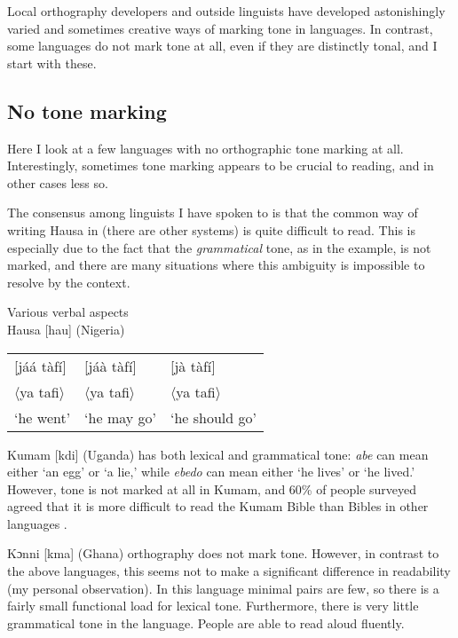 \documentclass[output=paper]{langscibook}
\begin{document}
  Local orthography developers and outside linguists have developed astonishingly varied and sometimes creative ways of marking tone in languages. In contrast, some languages do not mark tone at all, even if they are distinctly tonal, and I start with these.

  \subsection{No tone marking}
  \label{sec:HowToneMarked:NoToneMark:1}
    Here I look at a few languages with no orthographic tone marking at all. Interestingly, sometimes tone marking appears to be crucial to reading, and in other cases less so.

  The consensus among linguists I have spoken to is that the common way of writing Hausa in  (there are other systems) is quite difficult to read. This is especially due to the fact that the \textit{grammatical} tone, as in the example, is not marked, and there are many situations where this ambiguity is impossible to resolve by the context.

\ea Various verbal aspects\label{tab:cahill:VariousVerbalAspects:8}\\
Hausa [hau] (Nigeria)  \citep{Harley2012}\smallskip\\
\begin{tabularx}{\linewidth}{@{}XXX@{}}
[jáá tàfí] & [jáà tàfí] & [jà tàfí]\\
$\langle$ya tafi$\rangle$ & $\langle$ya tafi$\rangle$ & $\langle$ya tafi$\rangle$\\
‘he went’  &  ‘he may go’   & ‘he should go’\\
\end{tabularx}
\z
    
    Kumam [kdi] (Uganda) has both lexical and grammatical tone: \textit{abe} can mean either ‘an egg’ or ‘a lie,’ while \textit{ebedo} can mean either ‘he lives’ or ‘he lived.’ However, tone is not marked at all in Kumam, and 60\% of people surveyed agreed that it is more difficult to read the Kumam Bible than Bibles in other languages \citep{Edonyu2015}.

     Kɔnni [kma] (Ghana) orthography does not mark tone. However, in contrast to the above languages, this seems not to make a significant difference in readability (my personal observation). In this language minimal pairs are few, so there is a fairly small functional load for lexical tone. Furthermore, there is very little grammatical tone in the language. People are able to read aloud fluently.
\end{document}

